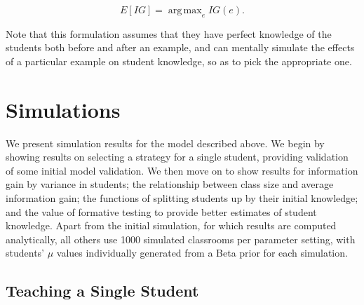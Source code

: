 \documentclass[10pt,letterpaper]{article}
\DeclareMathOperator*{\argmax}{arg\,max}
\begin{document}
\begin{equation}
E[IG] = \argmax_e {IG(e)}.
\end{equation}

Note that this formulation assumes that they have perfect knowledge of the students both before and after an example, and can mentally simulate the effects of a particular example on student knowledge, so as to pick the appropriate one. 

 \section{Simulations}

We present simulation results for the model described above. We begin by showing results on selecting a strategy for a single student, providing validation of some initial model validation. We then move on to show results for information gain by variance in students; the relationship between class size and average information gain; the functions of splitting students up by their initial knowledge; and the value of formative testing to provide better estimates of student knowledge. Apart from the initial simulation, for which results are computed analytically, all others use 1000 simulated classrooms per parameter setting, with students' $\mu$ values individually generated from a Beta prior for each simulation.

\subsection{Teaching a Single Student}
\end{document}
